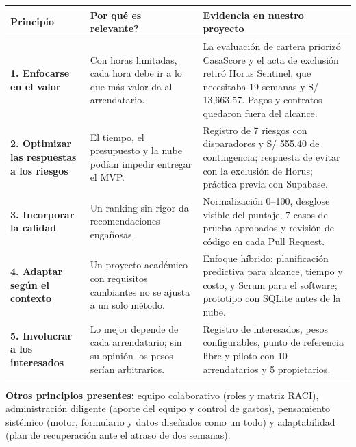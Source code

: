 \documentclass[11pt,a4paper]{article}
\begin{document}
\vspace{0.1cm}
{\small
{}
\noindent\begin{tabularx}{\textwidth}{@{}P{3.0cm} L L@{}}
\toprule
{}
\textbf{Principio} & \textbf{Por qué es relevante?} & \textbf{Evidencia en nuestro proyecto} \\
\midrule
\textbf{1. Enfocarse en el valor} & Con horas limitadas, cada hora debe ir a lo que más valor da al arrendatario. & La evaluación de cartera priorizó CasaScore y el acta de exclusión retiró Horus Sentinel, que necesitaba 19 semanas y S/ 13,663.57. Pagos y contratos quedaron fuera del alcance. \\
\textbf{2. Optimizar las respuestas a los riesgos} & El tiempo, el presupuesto y la nube podían impedir entregar el MVP. & Registro de 7 riesgos con disparadores y S/ 555.40 de contingencia; respuesta de evitar con la exclusión de Horus; práctica previa con Supabase. \\
\textbf{3. Incorporar la calidad} & Un ranking sin rigor da recomendaciones engañosas. & Normalización 0--100, desglose visible del puntaje, 7 casos de prueba aprobados y revisión de código en cada Pull Request. \\
\textbf{4. Adaptar según el contexto} & Un proyecto académico con requisitos cambiantes no se ajusta a un solo método. & Enfoque híbrido: planificación predictiva para alcance, tiempo y costo, y Scrum para el software; prototipo con SQLite antes de la nube. \\
\textbf{5. Involucrar a los interesados} & Lo mejor depende de cada arrendatario; sin su opinión los pesos serían arbitrarios. & Registro de interesados, pesos configurables, punto de referencia libre y piloto con 10 arrendatarios y 5 propietarios. \\
\bottomrule
\end{tabularx}
}

\vspace{0.1cm}
\noindent\textbf{Otros principios presentes:} equipo colaborativo (roles y matriz RACI), administración diligente (aporte del equipo y control de gastos), pensamiento sistémico (motor, formulario y datos diseñados como un todo) y adaptabilidad (plan de recuperación ante el atraso de dos semanas).

\end{document}
